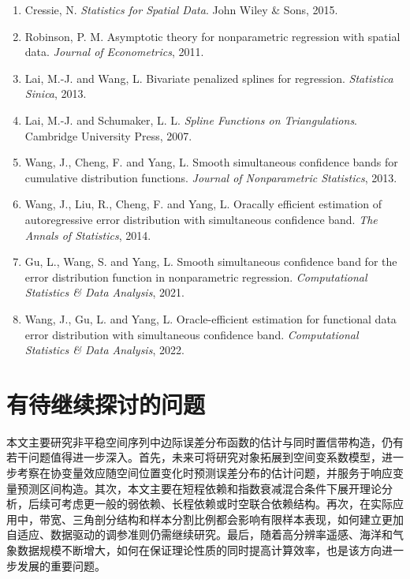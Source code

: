 \documentclass[UTF8,a4paper,11pt]{ctexart}
\begin{document}
\begin{enumerate}
  \item Cressie, N. \textit{Statistics for Spatial Data}. John Wiley \& Sons, 2015.
  \item Robinson, P. M. Asymptotic theory for nonparametric regression with spatial data. \textit{Journal of Econometrics}, 2011.
  \item Lai, M.-J. and Wang, L. Bivariate penalized splines for regression. \textit{Statistica Sinica}, 2013.
  \item Lai, M.-J. and Schumaker, L. L. \textit{Spline Functions on Triangulations}. Cambridge University Press, 2007.
  \item Wang, J., Cheng, F. and Yang, L. Smooth simultaneous confidence bands for cumulative distribution functions. \textit{Journal of Nonparametric Statistics}, 2013.
  \item Wang, J., Liu, R., Cheng, F. and Yang, L. Oracally efficient estimation of autoregressive error distribution with simultaneous confidence band. \textit{The Annals of Statistics}, 2014.
  \item Gu, L., Wang, S. and Yang, L. Smooth simultaneous confidence band for the error distribution function in nonparametric regression. \textit{Computational Statistics \& Data Analysis}, 2021.
  \item Wang, J., Gu, L. and Yang, L. Oracle-efficient estimation for functional data error distribution with simultaneous confidence band. \textit{Computational Statistics \& Data Analysis}, 2022.
\end{enumerate}

\section{有待继续探讨的问题}

本文主要研究非平稳空间序列中边际误差分布函数的估计与同时置信带构造，仍有若干问题值得进一步深入。首先，未来可将研究对象拓展到空间变系数模型，进一步考察在协变量效应随空间位置变化时预测误差分布的估计问题，并服务于响应变量预测区间构造。其次，本文主要在短程依赖和指数衰减混合条件下展开理论分析，后续可考虑更一般的弱依赖、长程依赖或时空联合依赖结构。再次，在实际应用中，带宽、三角剖分结构和样本分割比例都会影响有限样本表现，如何建立更加自适应、数据驱动的调参准则仍需继续研究。最后，随着高分辨率遥感、海洋和气象数据规模不断增大，如何在保证理论性质的同时提高计算效率，也是该方向进一步发展的重要问题。
\end{document}
